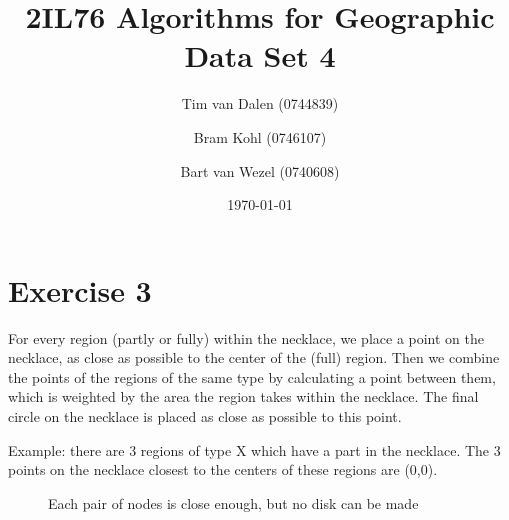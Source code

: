 \documentclass[a4paper,11pt]{article}
\title{
	2IL76 Algorithms for Geographic Data Set 4 \\
}
\author{
	Tim van Dalen (0744839)
	\and
	Bram Kohl (0746107)
	\and
	Bart van Wezel (0740608)
}
\date{\today}
\begin{document}
	\maketitle
	
\section*{Exercise 3}
For every region (partly or fully) within the necklace, we place a point on the necklace, as close as possible to the center of the (full) region. Then we combine the points of the regions of the same type by calculating a point between them, which is weighted by the area the region takes within the necklace. The final circle on the necklace is placed as close as possible to this point.

Example: there are 3 regions of type X which have a part in the necklace. The 3 points on the necklace closest to the centers of these regions are (0,0). 


\begin{figure}[H]
	\centering
	\def\svgwidth{0.5\textwidth}
%	
	\caption{Each pair of nodes is close enough, but no disk can be made}
	\label{fig:nodisk}
\end{figure}
\end{document}
